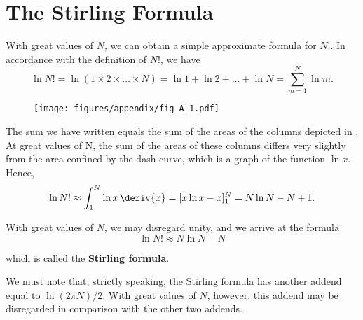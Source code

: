 \section{The Stirling Formula}\label{sec:A_3}

With great values of $N$, we can obtain a simple approximate formula for $N!$. In accordance with the definition of $N!$, we have
\begin{equation*}
    \ln{N!} = \ln(1\times 2\times\ldots\times N) = \ln{1} + \ln{2} + \ldots + \ln{N} = \sum_{m=1}^N \ln{m}.
\end{equation*}

\begin{figure}[!htb]
	\begin{center}
		\texttt{[image: figures/appendix/fig\_A\_1.pdf]}
		\caption[]{}
		\label{fig:A_1}
	\end{center}
\end{figure}

\noindent
The sum we have written equals the sum of the areas of the columns depicted in . At great values of N, the sum of the areas of
these columns differs very slightly from the area confined by the dash curve, which is a graph of the function $\ln{x}$. Hence,
\begin{equation*}
    \ln{N!} \approx \int_1^N \ln{x}\,\deriv{x} = [x\ln{x} - x]_1^N = N\ln{N} - N + 1.
\end{equation*}

\noindent
With great values of $N$, we may disregard unity, and we arrive at the formula
\begin{equation}\label{eq:A_7}
    \ln{N!} \approx N \ln{N} - N
\end{equation}

\noindent
which is called the \textbf{Stirling formula}.

We must note that, strictly speaking, the Stirling formula has another addend equal to $\ln(2\pi N)/2$. With great values of $N$, however, this addend may be disregarded in comparison with the other two addends.
